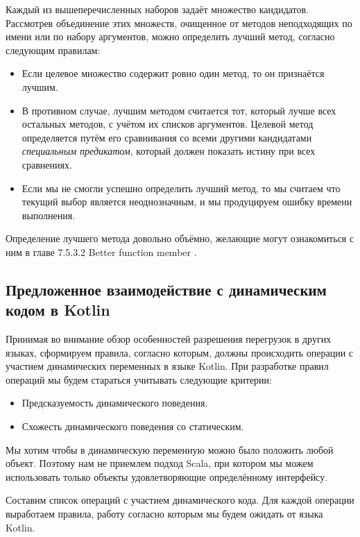 Каждый из вышеперечисленных наборов задаёт множество кандидатов. Рассмотрев объединение этих множеств, очищенное от методов неподходящих по имени или по набору аргументов, можно определить лучший метод, согласно следующим правилам:

\begin{itemize}
    \item Если целевое множество содержит ровно один метод, то он признаётся лучшим.
    \item В противном случае, лучшим методом считается тот, который лучше всех остальных методов, с учётом их списков аргументов. Целевой метод определяется путём его сравнивания со всеми другими кандидатами \textit{специальным предикатом}, который должен показать истину при всех сравнениях.
    \item Если мы не смогли успешно определить лучший метод, то мы считаем что текущий выбор является неоднозначным, и мы продуцируем ошибку времени выполнения.
\end{itemize}

Определение лучшего метода довольно объёмно, желающие могут ознакомиться с ним в главе 7.5.3.2 Better function member \cite{csharp:languageSpecification}.


\subsection{Предложенное взаимодействие с динамическим кодом в Kotlin}

Принимая во внимание обзор особенностей разрешения перегрузок в других языках, сформируем правила, согласно которым, должны происходить операции с участием динамических переменных в языке Kotlin. При разработке правил операций мы будем стараться учитывать следующие критерии:

\begin{itemize}
    \item Предсказуемость динамического поведения.
    \item Схожесть динамического поведения со статическим.
\end{itemize}

Мы хотим чтобы в динамическую переменную можно было положить любой объект. Поэтому нам не приемлем подход Scala, при котором мы можем использовать только объекты удовлетворяющие определённому интерфейсу.

Составим список операций с участием динамического кода. Для каждой операции выработаем правила, работу согласно которым мы будем ожидать от языка Kotlin.


